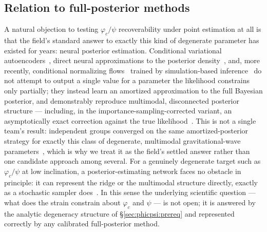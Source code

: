\documentclass[11pt]{article}
\begin{document}
\subsection{Relation to full-posterior methods}
\label{sec:phicpsi:npe}

A natural objection to testing $\varphi_c/\psi$ recoverability under point estimation at all is that the field's standard answer to exactly this kind of degenerate parameter has existed for years: neural posterior estimation.
Conditional variational autoencoders~\citep{gabbard2022vitamin}, direct neural approximations to the posterior density~\citep{chua2020learning,green2020complete}, and, more recently, conditional normalizing flows~\citep{papamakarios2021normalizing} trained by simulation-based inference~\citep{cranmer2020frontier,dax2021dingo,dax2023dingois} do not attempt to output a single value for a parameter the likelihood constrains only partially; they instead learn an amortized approximation to the full Bayesian posterior, and demonstrably reproduce multimodal, disconnected posterior structure --- including, in the importance-sampling-corrected variant, an asymptotically exact correction against the true likelihood~\citep{dax2023dingois}.
This is not a single team's result: independent groups converged on the same amortized-posterior strategy for exactly this class of degenerate, multimodal gravitational-wave parameters~\citep{chua2020learning,green2020complete,gabbard2022vitamin,dax2021dingo}, which is why we treat it as the field's settled answer rather than one candidate approach among several.
For a genuinely degenerate target such as $\varphi_c/\psi$ at low inclination, a posterior-estimating network faces no obstacle in principle: it can represent the ridge or the multimodal structure directly, exactly as a stochastic sampler does~\citep{veitch2015lalinference,ashton2019bilby}.
In this sense the underlying scientific question --- what does the strain constrain about $\varphi_c$ and $\psi$ --- is not open; it is answered by the analytic degeneracy structure of \S\ref{sec:phicpsi:prereq} and represented correctly by any calibrated full-posterior method.
\end{document}
